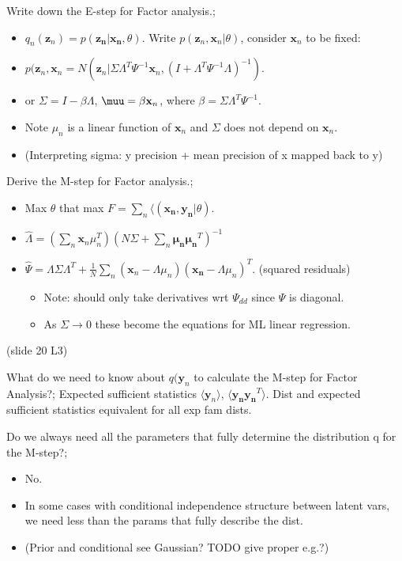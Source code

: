\documentclass{article}
\begin{document}
Write down the E-step for Factor analysis.; \begin{itemize}
    \item $q_n(\mathbf{z}_n) = p(\mathbf{z_n|x_n}, \theta)$. Write $p(\mathbf{z}_n, \mathbf{x}_n|\theta)$, consider $\mathbf{x}_n$ to be fixed: 
        \item $p(\mathbf{z}_n, \mathbf{x}_n = N(\mathbf{z}_n | \Sigma\Lambda^T\Psi^{-1}\mathbf{x}_n, (I+\Lambda^T\Psi^{-1}\Lambda)^{-1})$.
        \item or $\Sigma = I - \beta\Lambda$, $\muu = \beta\mathbf{x}_n$, where $\beta=\Sigma\Lambda^T\Psi^{-1}$.
        \item Note $\mu_n$ is a linear function of $\mathbf{x}_n$ and $\Sigma$ does not depend on $\mathbf{x}_n$.
        \item (Interpreting sigma: y precision + mean precision of x mapped back to y)
\end{itemize}

Derive the M-step for Factor analysis.; \begin{itemize}
    \item Max $\theta$ that max $F=\sum_n \langle (\mathbf{x_n, y_n}|\theta)$.
    \item $\hat\Lambda = (\sum_n \mathbf{x}_n\mu_n^T)(N\Sigma+\sum_n\mathbf{\mu_n\mu_n}^T)^{-1}$
    \item $\hat{\Psi} = \Lambda\Sigma\Lambda^T + \frac{1}{N}\sum_n(\mathbf{x}_n-\Lambda\mu_n)(\mathbf{x_n}-\Lambda\mu_n)^T$. (squared residuals)\begin{itemize}
        \item Note: should only take derivatives wrt $\Psi_{dd}$ since $\Psi$ is diagonal.
        \item As $\Sigma\rightarrow 0$ these become the equations for ML linear regression.
    \end{itemize}
\end{itemize} (slide 20 L3)

What do we need to know about $q(\mathbf{y}_n$ to calculate the M-step for Factor Analysis?; Expected sufficient statistics $\langle \mathbf{y}_n \rangle$, $\langle \mathbf{y_ny_n}^T \rangle$. Dist and expected sufficient statistics equivalent for all exp fam dists.

Do we always need all the parameters that fully determine the distribution q for the M-step?; \begin{itemize}
    \item No.
    \item In some cases with conditional independence structure between latent vars, we need less than the params that fully describe the dist.
    \item (Prior and conditional see Gaussian? TODO give proper e.g.?)
\end{itemize}
\end{document}
